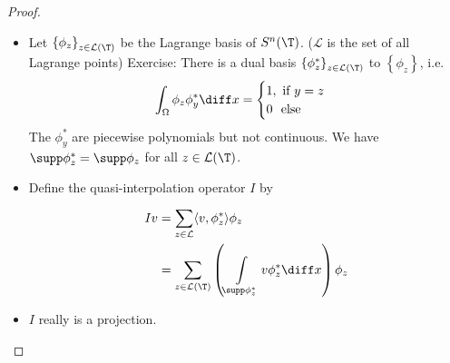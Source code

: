 \begin{proof}\
	\begin{itemize}
		\item Let $\left\{ \phi_{z} \right\}_{z \in \mathcal{L}(\T)}$ be the Lagrange basis of $S^n(\T)$.
			($\mathcal{L}$ is the set of all Lagrange points)
			Exercise: There is a dual basis $\left\{ \phi^*_{z} \right\}_{z \in \mathcal{L}(\T)}$ to $\left\{ \phi_{z} \right\}$, i.e.
			\begin{equation*}
				\int_{\Omega} \phi_{z} \phi^*_{y} \diff x = \begin{cases}
					1, \text{ if } y=z\\
					0\ \text{ else}
				\end{cases}
			\end{equation*}
			The $\phi_{y}^*$ are piecewise polynomials but not continuous. We have
			$\supp \phi_{z}^* = \supp \phi_{z}$ for all $z \in \mathcal{L}(\T)$.
		\item Define the quasi-interpolation operator $I$ by
			\begin{align*}
				Iv &= \sum\limits_{z \in \mathcal{L}}^{} \langle v,\phi_{z}^* \rangle \phi_{z}\\
           &= \sum\limits_{z \in \mathcal{L}(\T)} \left(\int\limits_{\supp \phi_{z}^*} v\phi_{z}^* \diff x\right)\phi_{z}
			\end{align*}
		\item $I$ really is a projection.


\end{itemize}
\end{proof}

